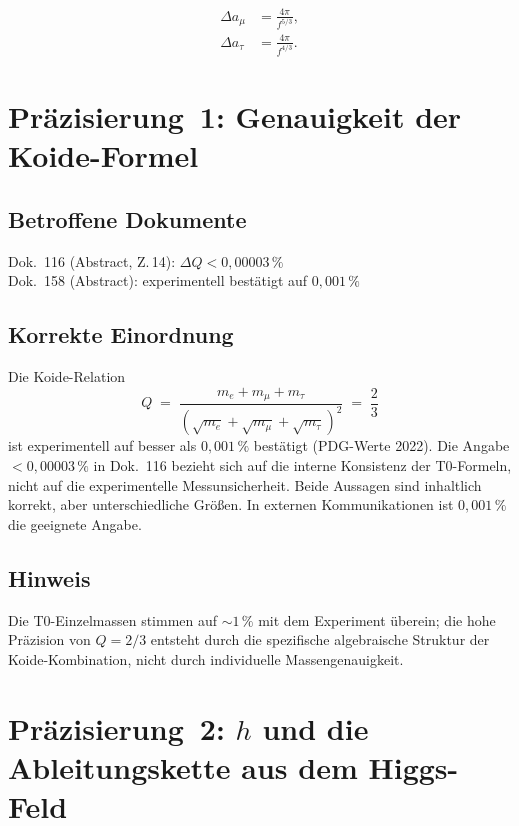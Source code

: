 \begin{align}
  \Delta a_\mu  &= \frac{4\pi}{f^{5/3}}, \tag{186.5}\\
  \Delta a_\tau &= \frac{4\pi}{f^{4/3}}. \tag{186.6}
\end{align}

\section{Präzisierung~1: Genauigkeit der Koide-Formel}

\subsection*{Betroffene Dokumente}

Dok.~116 (Abstract, Z.\,14): $\Delta Q < 0{,}00003\,\%$ \\
Dok.~158 (Abstract): \glqq experimentell bestätigt auf $0{,}001\,\%$\grqq

\subsection*{Korrekte Einordnung}

Die Koide-Relation
\begin{equation}
  Q \;=\; \frac{m_e + m_\mu + m_\tau}
               {(\sqrt{m_e}+\sqrt{m_\mu}+\sqrt{m_\tau})^2}
  \;=\; \frac{2}{3}
  \tag{186.7}
\end{equation}
ist experimentell auf besser als $0{,}001\,\%$ bestätigt
(PDG-Werte 2022). Die Angabe $< 0{,}00003\,\%$ in Dok.~116 bezieht
sich auf die interne Konsistenz der T0-Formeln, nicht auf die
experimentelle Messunsicherheit. Beide Aussagen sind inhaltlich korrekt,
aber unterschiedliche Größen. In externen Kommunikationen ist
$0{,}001\,\%$ die geeignete Angabe.

\subsection*{Hinweis}

Die T0-Einzelmassen stimmen auf $\sim 1\,\%$ mit dem Experiment überein;
die hohe Präzision von $Q = 2/3$ entsteht durch die spezifische
algebraische Struktur der Koide-Kombination, nicht durch individuelle
Massengenauigkeit.

\section{Präzisierung~2: $h$ und die Ableitungskette aus dem Higgs-Feld}

